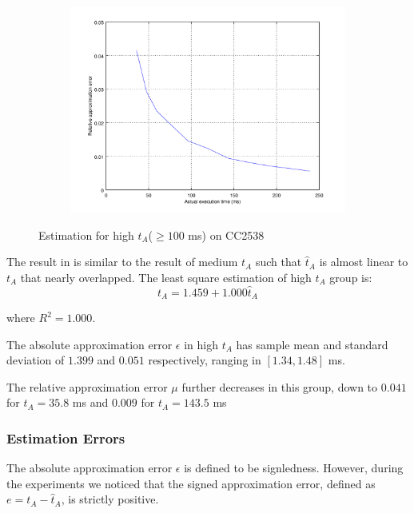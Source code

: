 \begin{figure}[ht!]
\begin{subfigure}{0.45\linewidth}
	\includegraphics[width=\linewidth]{fig/highrtvtaerr.png}
	\end{subfigure}
	\caption{Estimation for high $t_A$($\geq 100$ ms) on CC2538}
	\label{Fig: Estimation for high tA}
\end{figure}

The result in  is similar to the result of medium $t_A$ such that $\hat{t}_A$ is almost linear to $t_A$ that nearly overlapped. The least square estimation of high $t_A$ group is:
\begin{equation}
	t_A = 1.459 + 1.000\hat{t}_A
\end{equation}

where $R^2 = 1.000$. 

The absolute approximation error $\epsilon$ in high $t_A$ has sample mean and standard deviation of $1.399$ and $0.051$ respectively, ranging in $[1.34, 1.48]$ ms.

The relative approximation error $\mu$ further decreases in this group, down to $0.041$  for $t_A = 35.8$ ms and $0.009$ for $t_A = 143.5$ ms


\subsubsection{Estimation Errors}

The absolute approximation error $\epsilon$ is defined to be signledness. However, during the experiments we noticed that the signed approximation error, defined as $e = t_A - \hat{t}_A$, is strictly positive. 

